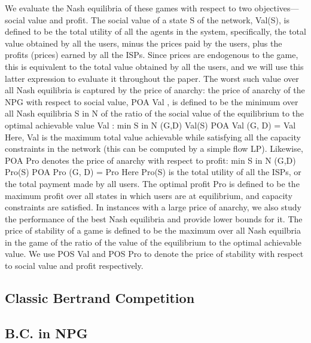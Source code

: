 \documentclass{beamer}
\begin{document}
\begin{frame}
We evaluate the Nash equilibria of these games with respect to two objectives—
social value and profit. The social value of a state S of the network, Val(S), is
defined to be the total utility of all the agents in the system, specifically, the
total value obtained by all the users, minus the prices paid by the users, plus
the profits (prices) earned by all the ISPs. Since prices are endogenous to the
game, this is equivalent to the total value obtained by all the users, and we will
use this latter expression to evaluate it throughout the paper. The worst such
value over all Nash equilibria is captured by the price of anarchy: the price of
anarchy of the NPG with respect to social value, POA Val , is defined to be the
minimum over all Nash equilibria S in N of the ratio of the social value of the
equilibrium to the optimal achievable value Val  :
min S in N (G,D) Val(S)
POA Val (G, D) =
Val 
Here, Val  is the maximum total value achievable while satisfying all the capacity
constraints in the network (this can be computed by a simple flow LP). Likewise,
POA Pro denotes the price of anarchy with respect to profit:
min S in N (G,D) Pro(S)
POA Pro (G, D) =
Pro 
Here Pro(S) is the total utility of all the ISPs, or the total payment made by
all users. The optimal profit Pro  is defined to be the maximum profit over all
states in which users are at equilibrium, and capacity constraints are satisfied.
In instances with a large price of anarchy, we also study the performance of
the best Nash equilibria and provide lower bounds for it. The price of stability
of a game is defined to be the maximum over all Nash equilbria in the game
of the ratio of the value of the equilibrium to the optimal achievable value. We
use POS Val and POS Pro to denote the price of stability with respect to social
value and profit respectively.
\end{frame}




\subsection{Classic Bertrand Competition}

\subsection{B.C. in NPG}
\end{document}
